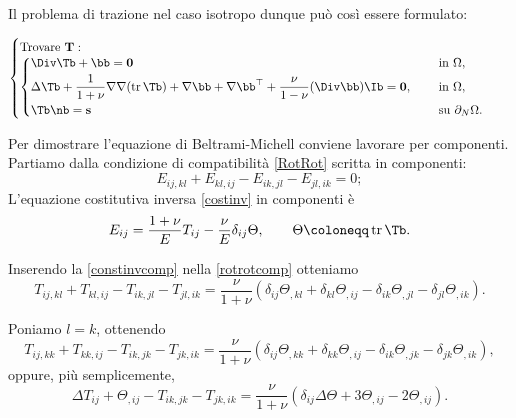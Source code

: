 Il problema di trazione  nel caso isotropo dunque può così essere formulato:
\begin{definition}
	\begin{equation}
		\begin{cases}
			\mathrm{Trovare~}\mathbf{T}:\\
			\begin{cases}
				\begin{aligned}
					&\Div\Tb +\bb=\mathbf{0} \quad &&\mathrm{~in~}\Omega,\\
					&\Delta \Tb +\frac{1}{1+\nu}\nabla \nabla (\operatorname{tr}\Tb)+\nabla \bb+\nabla \bb^\top+\frac{\nu}{1-\nu}(\Div \bb) \Ib =\mathbf{0}, \quad &&\mathrm{~in~}\Omega,\\
					&\Tb \nb=\mathbf{s} &&\mathrm{~su~}\partial_N\Omega.
				\end{aligned}
			\end{cases}
		\end{cases}
	\end{equation}
\end{definition}

Per dimostrare l'equazione di Beltrami-Michell conviene lavorare per componenti.
Partiamo dalla condizione di compatibilità \eqref{RotRot} scritta in componenti:
\begin{equation}\label{rotrotcomp}
	E_{ij,kl} + E_{kl,ij} - E_{ik,jl} - E_{jl,ik} = 0;
\end{equation}
L'equazione costitutiva inversa \eqref{costinv} in componenti è
\begin{equation}\label{constinvcomp}
	E_{ij} = \frac{1+\nu}{E} T_{ij} - \frac{\nu}{E} \delta_{ij} \Theta, \qquad 	\Theta \coloneqq \operatorname{tr} \Tb.
\end{equation}


Inserendo la \eqref{constinvcomp} nella \eqref{rotrotcomp} otteniamo
\begin{equation}\label{rotrotcompT}
	T_{ij,kl} + T_{kl,ij} - T_{ik,jl} - T_{jl,ik} = \frac{\nu}{1+\nu} \left( \delta_{ij} \Theta_{,kl} + \delta_{kl} \Theta_{,ij} - \delta_{ik} \Theta_{,jl} - \delta_{jl} \Theta_{,ik} \right).
\end{equation}

Poniamo $l = k$, ottenendo
\begin{equation}
	T_{ij,kk} + T_{kk,ij} - T_{ik,jk} - T_{jk,ik} = \frac{\nu}{1+\nu} \left( \delta_{ij} \Theta_{,kk} + \delta_{kk} \Theta_{,ij} - \delta_{ik} \Theta_{,jk} - \delta_{jk} \Theta_{,ik} \right),
\end{equation}
oppure, più semplicemente,
\begin{equation}
	\Delta T_{ij} + \Theta_{,ij} - T_{ik,jk} - T_{jk,ik} = \frac{\nu}{1+\nu} \left( \delta_{ij} \Delta \Theta + 3 \Theta_{,ij} - 2 \Theta_{,ij} \right).
\end{equation}

